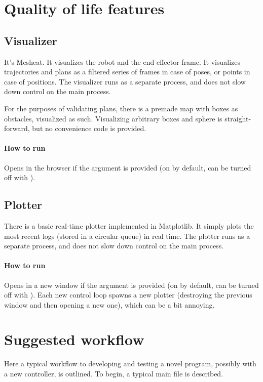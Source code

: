 



\section{Quality of life features}
\subsection{Visualizer}
It's Meshcat. It visualizes the robot and the end-effector frame. 
It visualizes trajectories and plans as a filtered series of frames in case of poses,
or points in case of positions.
The visualizer runs as a separate process, and does not slow down control on the main process.

For the purposes of validating plans, there is a premade map with boxes as obstacles,
visualized as such. Visualizing arbitrary boxes and sphere is straight-forward,
but no convenience code is provided.

\paragraph{How to run}
Opens in the browser if the  argument is provided (on by default,
can be turned off with ). 

\subsection{Plotter}
There is a basic real-time plotter implemented in Matplotlib. It simply
plots the most recent logs (stored in a circular queue) in real time. 
The plotter runs as a separate process, and does not slow down control on the main process.

\paragraph{How to run}
Opens in a new window if the  argument is provided (on by default,
can be turned off with ). 
Each new control loop spawns a new plotter (destroying the previous window
and then opening a new one), which can be a bit annoying.





\section{Suggested workflow}
\label{sec-suggested-workflow}
Here a typical workflow to developing and testing a novel program,
possibly with a new controller, is outlined.
To begin, a typical main file is described.

